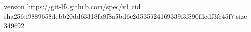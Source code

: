 version https://git-lfs.github.com/spec/v1
oid sha256:f9889658debb20dd63318fa8f8a5bd6e2d535624169339f3f890fdcdf3fc45f7
size 349692
